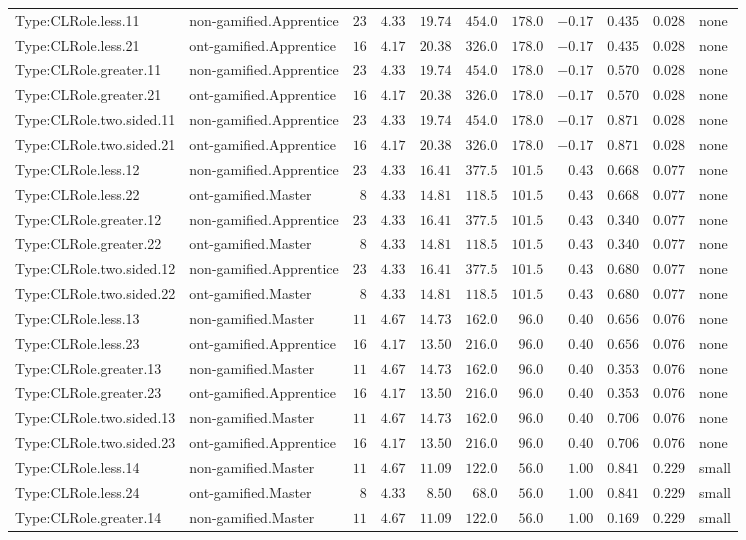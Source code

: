 \documentclass[6pt,a4paper]{article}
\begin{document}
{\begin{longtable}{llrrrrrrrrl}
Type:CLRole.less.11&non-gamified.Apprentice&$23$&$4.33$&$19.74$&$ 454.0$&$178.0$&$-0.17$&$0.435$&$0.028$&none\tabularnewline
Type:CLRole.less.21&ont-gamified.Apprentice&$16$&$4.17$&$20.38$&$ 326.0$&$178.0$&$-0.17$&$0.435$&$0.028$&none\tabularnewline
Type:CLRole.greater.11&non-gamified.Apprentice&$23$&$4.33$&$19.74$&$ 454.0$&$178.0$&$-0.17$&$0.570$&$0.028$&none\tabularnewline
Type:CLRole.greater.21&ont-gamified.Apprentice&$16$&$4.17$&$20.38$&$ 326.0$&$178.0$&$-0.17$&$0.570$&$0.028$&none\tabularnewline
Type:CLRole.two.sided.11&non-gamified.Apprentice&$23$&$4.33$&$19.74$&$ 454.0$&$178.0$&$-0.17$&$0.871$&$0.028$&none\tabularnewline
Type:CLRole.two.sided.21&ont-gamified.Apprentice&$16$&$4.17$&$20.38$&$ 326.0$&$178.0$&$-0.17$&$0.871$&$0.028$&none\tabularnewline
Type:CLRole.less.12&non-gamified.Apprentice&$23$&$4.33$&$16.41$&$ 377.5$&$101.5$&$ 0.43$&$0.668$&$0.077$&none\tabularnewline
Type:CLRole.less.22&ont-gamified.Master&$ 8$&$4.33$&$14.81$&$ 118.5$&$101.5$&$ 0.43$&$0.668$&$0.077$&none\tabularnewline
Type:CLRole.greater.12&non-gamified.Apprentice&$23$&$4.33$&$16.41$&$ 377.5$&$101.5$&$ 0.43$&$0.340$&$0.077$&none\tabularnewline
Type:CLRole.greater.22&ont-gamified.Master&$ 8$&$4.33$&$14.81$&$ 118.5$&$101.5$&$ 0.43$&$0.340$&$0.077$&none\tabularnewline
Type:CLRole.two.sided.12&non-gamified.Apprentice&$23$&$4.33$&$16.41$&$ 377.5$&$101.5$&$ 0.43$&$0.680$&$0.077$&none\tabularnewline
Type:CLRole.two.sided.22&ont-gamified.Master&$ 8$&$4.33$&$14.81$&$ 118.5$&$101.5$&$ 0.43$&$0.680$&$0.077$&none\tabularnewline
Type:CLRole.less.13&non-gamified.Master&$11$&$4.67$&$14.73$&$ 162.0$&$ 96.0$&$ 0.40$&$0.656$&$0.076$&none\tabularnewline
Type:CLRole.less.23&ont-gamified.Apprentice&$16$&$4.17$&$13.50$&$ 216.0$&$ 96.0$&$ 0.40$&$0.656$&$0.076$&none\tabularnewline
Type:CLRole.greater.13&non-gamified.Master&$11$&$4.67$&$14.73$&$ 162.0$&$ 96.0$&$ 0.40$&$0.353$&$0.076$&none\tabularnewline
Type:CLRole.greater.23&ont-gamified.Apprentice&$16$&$4.17$&$13.50$&$ 216.0$&$ 96.0$&$ 0.40$&$0.353$&$0.076$&none\tabularnewline
Type:CLRole.two.sided.13&non-gamified.Master&$11$&$4.67$&$14.73$&$ 162.0$&$ 96.0$&$ 0.40$&$0.706$&$0.076$&none\tabularnewline
Type:CLRole.two.sided.23&ont-gamified.Apprentice&$16$&$4.17$&$13.50$&$ 216.0$&$ 96.0$&$ 0.40$&$0.706$&$0.076$&none\tabularnewline
Type:CLRole.less.14&non-gamified.Master&$11$&$4.67$&$11.09$&$ 122.0$&$ 56.0$&$ 1.00$&$0.841$&$0.229$&small\tabularnewline
Type:CLRole.less.24&ont-gamified.Master&$ 8$&$4.33$&$ 8.50$&$  68.0$&$ 56.0$&$ 1.00$&$0.841$&$0.229$&small\tabularnewline
Type:CLRole.greater.14&non-gamified.Master&$11$&$4.67$&$11.09$&$ 122.0$&$ 56.0$&$ 1.00$&$0.169$&$0.229$&small\tabularnewline

\end{longtable}}
\end{document}

